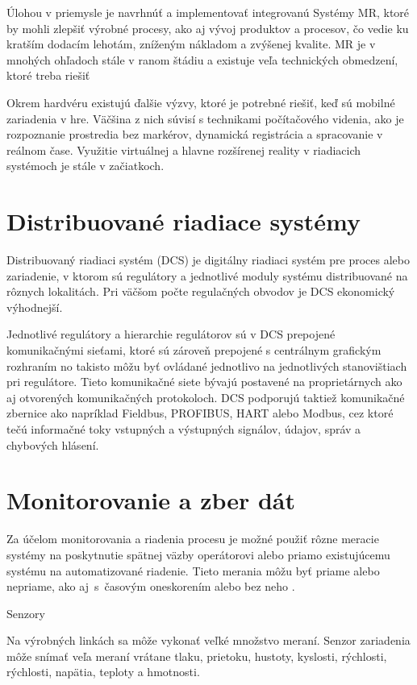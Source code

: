 \documentclass[]{tukediphc}
\begin{document}
Úlohou v priemysle je navrhnúť a implementovať integrovanú
Systémy MR, ktoré by mohli zlepšiť výrobné procesy, ako aj vývoj produktov a procesov, čo vedie ku kratším dodacím lehotám, zníženým nákladom a zvýšenej kvalite. MR je v mnohých ohľadoch stále v ranom štádiu a existuje veľa technických obmedzení, ktoré treba riešiť
\citep{soeteMixedRealitySCADA2015}


Okrem hardvéru existujú ďalšie výzvy, ktoré je potrebné riešiť, keď sú mobilné zariadenia v hre. Väčšina z nich súvisí s technikami počítačového videnia, ako je rozpoznanie prostredia bez markérov, dynamická registrácia a spracovanie v reálnom čase. Využitie virtuálnej a hlavne rozšírenej reality v riadiacich systémoch je stále v začiatkoch. 


\section{Distribuované riadiace systémy}

Distribuovaný riadiaci systém (DCS) je digitálny riadiaci systém pre proces alebo zariadenie, v ktorom sú regulátory a jednotlivé moduly systému distribuované na rôznych lokalitách. Pri väčšom počte regulačných obvodov je DCS ekonomický výhodnejší.

Jednotlivé  regulátory a hierarchie regulátorov sú v DCS prepojené komunikačnými sieťami, ktoré sú zároveň prepojené s centrálnym grafickým rozhraním no takisto môžu byť ovládané jednotlivo na jednotlivých stanovištiach pri regulátore. Tieto komunikačné siete bývajú postavené na proprietárnych ako aj otvorených komunikačných protokoloch. DCS podporujú taktiež komunikačné zbernice ako napríklad Fieldbus, PROFIBUS, HART alebo Modbus, cez ktoré tečú informačné toky vstupných a výstupných signálov, údajov, správ a chybových hlásení.

\section{Monitorovanie a zber dát}

Za účelom monitorovania a riadenia procesu je možné použiť rôzne meracie systémy na poskytnutie spätnej väzby operátorovi alebo priamo existujúcemu systému na automatizované riadenie. Tieto merania môžu byť priame alebo nepriame, ako aj~s~časovým oneskorením alebo bez neho \cite{Widlund1998}.

Senzory

Na výrobných linkách sa môže vykonať veľké množstvo meraní. Senzor zariadenia môže snímať veľa meraní vrátane tlaku, prietoku, hustoty, kyslosti, rýchlosti, rýchlosti, napätia, teploty a hmotnosti.
\end{document}
